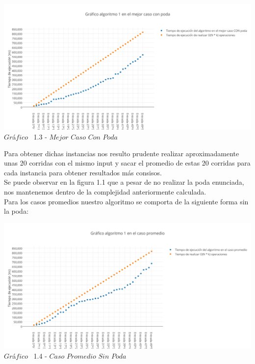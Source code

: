 \vspace*{0.3cm} \vspace*{0.3cm}
  \begin{center}
 \includegraphics[scale=0.65]{./EJ1/mejorcaso11.png}
 {$Gr$\'a$fico$ \ 1.3 - $Mejor$ $Caso$ $Con$ $Poda$}
  \end{center}
  \vspace*{0.3cm}

 Para obtener dichas instancias nos resulto prudente realizar aproximadamente unas 20 corridas con el mismo input y sacar el promedio de estas 20 corridas para cada instancia para obtener resultados m\'as consisos.\\ 

Se puede observar en la figura 1.1 que a pesar de no realizar la poda enunciada, nos mantenemos dentro de la complejidad anteriormente calculada.\\

Para los casos promedios nuestro algoritmo se comporta de la siguiente forma sin la poda: 

\vspace*{0.3cm} \vspace*{0.3cm}
  \begin{center}
 \includegraphics[scale=0.65]{./EJ1/promedio.png}
 {$Gr$\'a$fico$ \ 1.4 - $Caso$ $Promedio$ $Sin$ $Poda$}
  \end{center}
  \vspace*{0.3cm}
  
